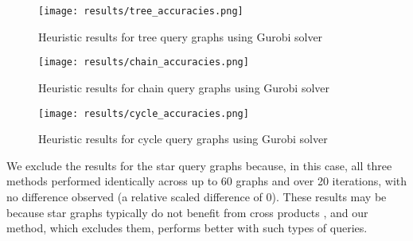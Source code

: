 \begin{figure}
    \centering
    \texttt{[image: results/tree\_accuracies.png]}
    \caption{Heuristic results for tree query graphs using Gurobi solver}
    \label{fig:tree_accuracies}
\end{figure}

\begin{figure}
    \centering
    \texttt{[image: results/chain\_accuracies.png]}
    \caption{Heuristic results for chain query graphs using Gurobi solver}
    \label{fig:chain_accuracies}
\end{figure}
    
\begin{figure}
    \centering
    \texttt{[image: results/cycle\_accuracies.png]}
    \caption{Heuristic results for cycle query graphs using Gurobi solver}
    \label{fig:cycle_accuracies}
\end{figure}

We exclude the results for the star query graphs because, in this case, all three methods performed identically across up to 60 graphs and over 20 iterations, with no difference observed (a relative scaled difference of 0). These results may be because star graphs typically do not benefit from cross products \cite{10.14778/3632093.3632112}, and our method, which excludes them, performs better with such types of queries.

